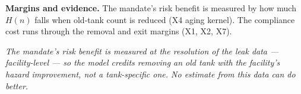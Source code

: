 \documentclass[
  letterpaper,
  DIV=11,
  numbers=noendperiod]{scrartcl}
\begin{document}
\textbf{Margins and evidence.} The mandate's risk benefit is measured by
how much \(H(n)\) falls when old-tank count is reduced (X4 aging
kernel). The compliance cost runs through the removal and exit margins
(X1, X2, X7).

\emph{The mandate's risk benefit is measured at the resolution of the
leak data --- facility-level --- so the model credits removing an old
tank with the facility's hazard improvement, not a tank-specific one. No
estimate from this data can do better.}
\end{document}
